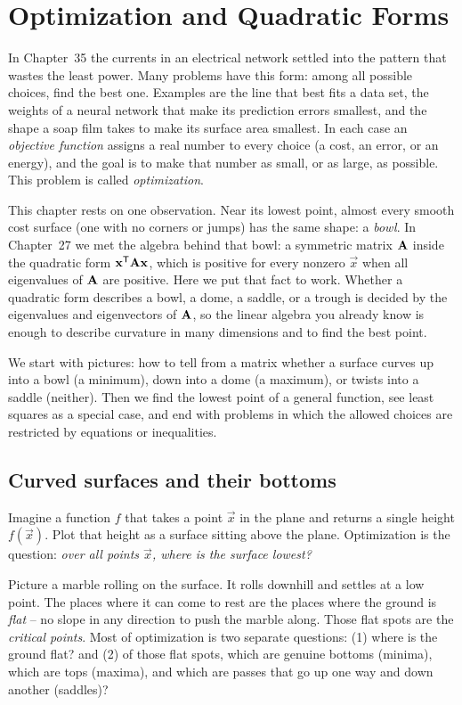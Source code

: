 \chapter{Optimization and Quadratic Forms}

In Chapter~35 the currents in an electrical network settled into the pattern that
wastes the least power. Many problems have this form: among all possible choices, find
the best one. Examples are the line that best fits a data set, the weights of a neural
network that make its prediction errors smallest, and the shape a soap film takes to
make its surface area smallest. In each case an \emph{objective function} assigns a
real number to every choice (a cost, an error, or an energy), and the goal is to make
that number as small, or as large, as possible. This problem is called
\emph{optimization}.

This chapter rests on one observation. Near its lowest point, almost every smooth cost
surface (one with no corners or jumps) has the same shape: a \emph{bowl}. In
Chapter~27 we met the algebra behind that bowl: a symmetric matrix $\mathbf{A}$ inside the
quadratic form $\mathbf{x}^{\mathsf{T}}\mathbf{A}\mathbf{x}$, which is positive for every nonzero
$\vec{x}$ when all eigenvalues of $\mathbf{A}$ are positive. Here we put that fact to
work. Whether a quadratic form describes a bowl, a dome, a saddle, or a trough is
decided by the eigenvalues and eigenvectors of $\mathbf{A}$, so the linear algebra you
already know is enough to describe curvature in many dimensions and to find the best
point.

We start with pictures: how to tell from a matrix whether a surface curves up into a
bowl (a minimum), down into a dome (a maximum), or twists into a saddle (neither). Then
we find the lowest point of a general function, see least squares as a special case,
and end with problems in which the allowed choices are restricted by equations or
inequalities.

\section{Curved surfaces and their bottoms}
\label{ch36:landscape}

Imagine a function $f$ that takes a
point $\vec{x}$ in the plane and returns a single height $f(\vec{x})$. Plot that
height as a surface sitting above the plane. Optimization is the question: \emph{over
all points $\vec{x}$, where is the surface lowest?}

\begin{intuitionbox}
Picture a marble rolling on the surface. It rolls downhill and settles at a low
point. The places where it can come to rest are the places where the ground is
\emph{flat} -- no slope in any direction to push the marble along. Those flat spots
are the \emph{critical points}. Most of optimization is two separate questions:
(1) where is the ground flat? and (2) of those flat spots, which are genuine
bottoms (minima), which are tops (maxima), and which are passes that go up one way
and down another (saddles)?
\end{intuitionbox}

